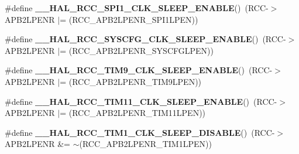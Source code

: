 \begin{DoxyCompactItemize}
\item 
\#define {\bfseries \+\_\+\+\_\+\+H\+A\+L\+\_\+\+R\+C\+C\+\_\+\+S\+P\+I1\+\_\+\+C\+L\+K\+\_\+\+S\+L\+E\+E\+P\+\_\+\+E\+N\+A\+B\+LE}()~(R\+CC-\/$>$A\+P\+B2\+L\+P\+E\+NR $\vert$= (R\+C\+C\+\_\+\+A\+P\+B2\+L\+P\+E\+N\+R\+\_\+\+S\+P\+I1\+L\+P\+EN))\hypertarget{group___r_c_c___a_p_b2___low_power___enable___disable_ga41997855b2cc7563c8ed0c9873d32daf}{}\label{group___r_c_c___a_p_b2___low_power___enable___disable_ga41997855b2cc7563c8ed0c9873d32daf}

\item 
\#define {\bfseries \+\_\+\+\_\+\+H\+A\+L\+\_\+\+R\+C\+C\+\_\+\+S\+Y\+S\+C\+F\+G\+\_\+\+C\+L\+K\+\_\+\+S\+L\+E\+E\+P\+\_\+\+E\+N\+A\+B\+LE}()~(R\+CC-\/$>$A\+P\+B2\+L\+P\+E\+NR $\vert$= (R\+C\+C\+\_\+\+A\+P\+B2\+L\+P\+E\+N\+R\+\_\+\+S\+Y\+S\+C\+F\+G\+L\+P\+EN))\hypertarget{group___r_c_c___a_p_b2___low_power___enable___disable_ga6e3a8ca9e554e3aa7aba57d034725655}{}\label{group___r_c_c___a_p_b2___low_power___enable___disable_ga6e3a8ca9e554e3aa7aba57d034725655}

\item 
\#define {\bfseries \+\_\+\+\_\+\+H\+A\+L\+\_\+\+R\+C\+C\+\_\+\+T\+I\+M9\+\_\+\+C\+L\+K\+\_\+\+S\+L\+E\+E\+P\+\_\+\+E\+N\+A\+B\+LE}()~(R\+CC-\/$>$A\+P\+B2\+L\+P\+E\+NR $\vert$= (R\+C\+C\+\_\+\+A\+P\+B2\+L\+P\+E\+N\+R\+\_\+\+T\+I\+M9\+L\+P\+EN))\hypertarget{group___r_c_c___a_p_b2___low_power___enable___disable_ga8fb59f888889fc998d1f7e64e370c9d1}{}\label{group___r_c_c___a_p_b2___low_power___enable___disable_ga8fb59f888889fc998d1f7e64e370c9d1}

\item 
\#define {\bfseries \+\_\+\+\_\+\+H\+A\+L\+\_\+\+R\+C\+C\+\_\+\+T\+I\+M11\+\_\+\+C\+L\+K\+\_\+\+S\+L\+E\+E\+P\+\_\+\+E\+N\+A\+B\+LE}()~(R\+CC-\/$>$A\+P\+B2\+L\+P\+E\+NR $\vert$= (R\+C\+C\+\_\+\+A\+P\+B2\+L\+P\+E\+N\+R\+\_\+\+T\+I\+M11\+L\+P\+EN))\hypertarget{group___r_c_c___a_p_b2___low_power___enable___disable_ga2d808a429ceb72c79908770e79ff3cfa}{}\label{group___r_c_c___a_p_b2___low_power___enable___disable_ga2d808a429ceb72c79908770e79ff3cfa}

\item 
\#define {\bfseries \+\_\+\+\_\+\+H\+A\+L\+\_\+\+R\+C\+C\+\_\+\+T\+I\+M1\+\_\+\+C\+L\+K\+\_\+\+S\+L\+E\+E\+P\+\_\+\+D\+I\+S\+A\+B\+LE}()~(R\+CC-\/$>$A\+P\+B2\+L\+P\+E\+NR \&= $\sim$(R\+C\+C\+\_\+\+A\+P\+B2\+L\+P\+E\+N\+R\+\_\+\+T\+I\+M1\+L\+P\+EN))\hypertarget{group___r_c_c___a_p_b2___low_power___enable___disable_ga990bf7664ac6c430c239eab292ec7ed5}{}\label{group___r_c_c___a_p_b2___low_power___enable___disable_ga990bf7664ac6c430c239eab292ec7ed5}


\end{DoxyCompactItemize}
